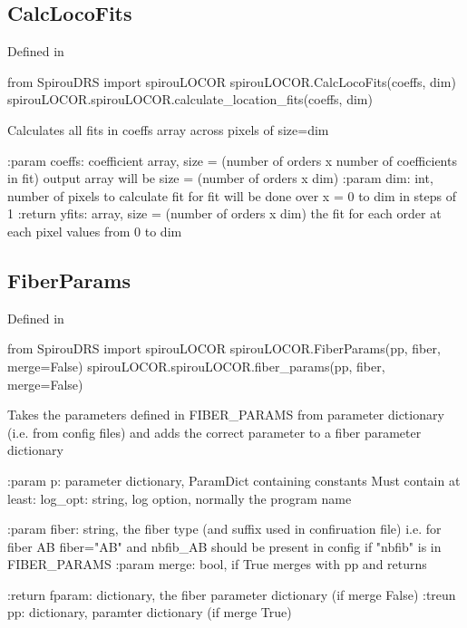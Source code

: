 \noindent\begin{minipage}{\textwidth}
\subsection{CalcLocoFits}

Defined in \spirouLOCOR{}

\begin{pythonbox}
from SpirouDRS import spirouLOCOR
spirouLOCOR.CalcLocoFits(coeffs, dim)
spirouLOCOR.spirouLOCOR.calculate_location_fits(coeffs, dim)
\end{pythonbox}

\begin{pythondocstring}
Calculates all fits in coeffs array across pixels of size=dim

:param coeffs: coefficient array,
               size = (number of orders x number of coefficients in fit)
               output array will be size = (number of orders x dim)
:param dim: int, number of pixels to calculate fit for
            fit will be done over x = 0 to dim in steps of 1
:return yfits: array,
               size = (number of orders x dim)
               the fit for each order at each pixel values from 0 to dim
\end{pythondocstring}
\end{minipage}

\noindent\begin{minipage}{\textwidth}
\subsection{FiberParams}

Defined in \spirouLOCOR{}

\begin{pythonbox}
from SpirouDRS import spirouLOCOR
spirouLOCOR.FiberParams(pp, fiber, merge=False)
spirouLOCOR.spirouLOCOR.fiber_params(pp, fiber, merge=False)
\end{pythonbox}

\begin{pythondocstring}
Takes the parameters defined in FIBER_PARAMS from parameter dictionary
(i.e. from config files) and adds the correct parameter to a fiber
parameter dictionary

:param p: parameter dictionary, ParamDict containing constants
    Must contain at least:
            log_opt: string, log option, normally the program name

:param fiber: string, the fiber type (and suffix used in confiruation file)
              i.e. for fiber AB fiber="AB" and nbfib_AB should be present
              in config if "nbfib" is in FIBER_PARAMS
:param merge: bool, if True merges with pp and returns

:return fparam: dictionary, the fiber parameter dictionary (if merge False)
:treun pp: dictionary, paramter dictionary (if merge True)
\end{pythondocstring}
\end{minipage}

